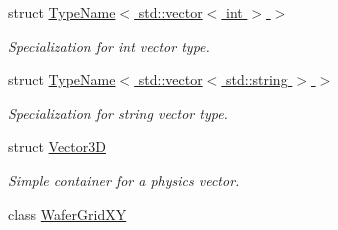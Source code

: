 \begin{DoxyCompactItemize}
struct \hyperlink{struct_d_d4hep_1_1_d_d_segmentation_1_1_type_name_3_01std_1_1vector_3_01int_01_4_01_4}{Type\+Name$<$ std\+::vector$<$ int $>$ $>$}
\begin{DoxyCompactList}\small\item\em Specialization for int vector type. \end{DoxyCompactList}\item 
struct \hyperlink{struct_d_d4hep_1_1_d_d_segmentation_1_1_type_name_3_01std_1_1vector_3_01std_1_1string_01_4_01_4}{Type\+Name$<$ std\+::vector$<$ std\+::string $>$ $>$}
\begin{DoxyCompactList}\small\item\em Specialization for string vector type. \end{DoxyCompactList}\item 
struct \hyperlink{struct_d_d4hep_1_1_d_d_segmentation_1_1_vector3_d}{Vector3D}
\begin{DoxyCompactList}\small\item\em Simple container for a physics vector. \end{DoxyCompactList}\item 
class \hyperlink{class_d_d4hep_1_1_d_d_segmentation_1_1_wafer_grid_x_y}{Wafer\+Grid\+XY}
\end{DoxyCompactItemize}
